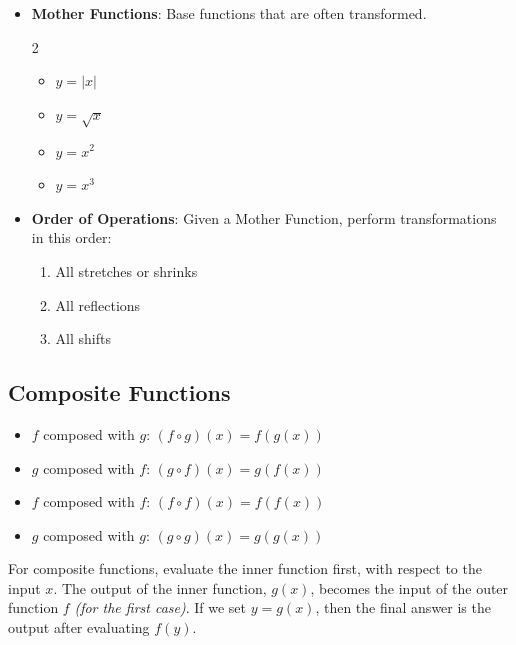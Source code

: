 \documentclass[10pt]{article}
\begin{document}
\begin{itemize}
    \item \textbf{Mother Functions}: Base functions that are often transformed.
        \begin{multicols}{2}
        \begin{itemize}[label=$\circ$]
            \item $y = |x|$
            \item $y = \sqrt{x}$
            \item $y=x^2$
            \item $y=x^3$
        \end{itemize}
        \end{multicols}
    
    
    \item \textbf{Order of Operations}: Given a Mother Function, perform transformations in this order:
    \indent \begin{enumerate}
        \item All stretches or shrinks
        \item All reflections
        \item All shifts
    \end{enumerate}
    

\end{itemize}


\newpage

\subsection*{Composite Functions}

\begin{itemize}
    \item $f$ composed with $g$: $(f \circ g)(x) = f(g(x))$
    \item $g$ composed with $f$: $(g \circ f)(x) = g(f(x))$
    \item $f$ composed with $f$: $(f \circ f)(x) = f(f(x))$
    \item $g$ composed with $g$: $(g \circ g)(x) = g(g(x))$
\end{itemize}

\noindent
For composite functions, evaluate the inner function first, with respect to the input $x$. The output of the inner function, $g(x)$, becomes the input of the outer function $f$ \textit{(for the first case)}. If we set $y=g(x)$, then the final answer is the output after evaluating $f(y)$.
\end{document}
